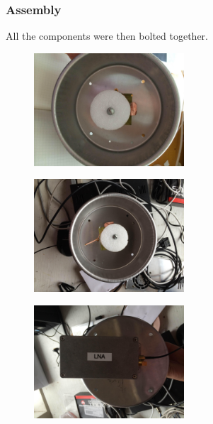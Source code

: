 \documentclass[11pt]{article} %
\begin{document}
\subsubsection{Assembly}
All the components were then bolted together. 


\begin{figure}
  \centering
  \caption{   }
  \includegraphics[width=0.50\textwidth]{feed/17.jpeg}
\end{figure}


\begin{figure}
  \centering
  \caption{   }
  \includegraphics[width=0.50\textwidth]{feed/18.jpeg}
\end{figure}


\begin{figure}
  \centering
  \caption{   }
  \includegraphics[width=0.50\textwidth]{feed/19.jpeg}
\end{figure}
\end{document}
